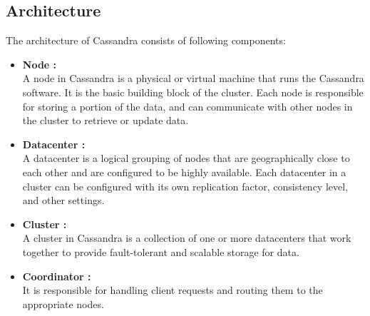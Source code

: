\documentclass[12pt]{article}
\begin{document}
\subsection{Architecture}
The architecture of Cassandra consists of following components:
\begin{itemize}
    \item {\bfseries Node : \\}
    A node in Cassandra is a physical or virtual machine that runs the Cassandra software. It is the basic building block of the cluster. Each node is responsible for storing a portion of the data, and can communicate with other nodes in the cluster to retrieve or update data.
    \item {\bfseries Datacenter :\\}
    A datacenter is a logical grouping of nodes that are geographically close to each other and are configured to be highly available. Each datacenter in a cluster can be configured with its own replication factor, consistency level,
    and other settings.
    \item {\bfseries Cluster : \\}
    A cluster in Cassandra is a collection of one or more datacenters that work together to provide fault-tolerant and scalable storage for data.
    \item {\bfseries Coordinator : \\}
    It is responsible for handling client requests and routing them to the appropriate nodes.
\end{itemize}
\end{document}
